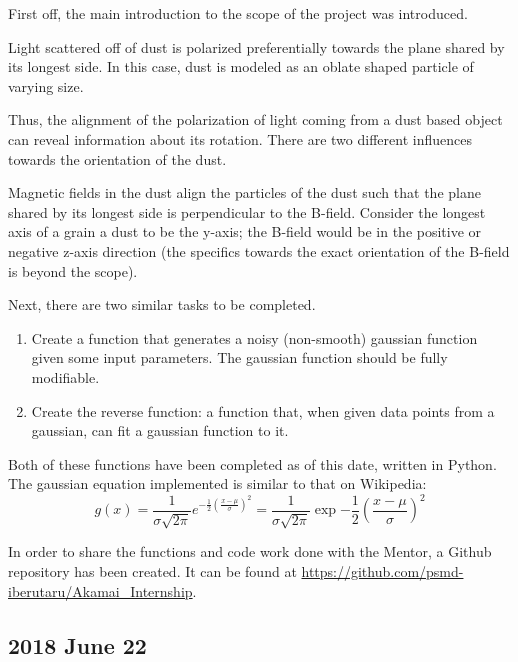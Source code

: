 \documentclass[twocolumn]{article}
\begin{document}
\begin{meetingnotes*}
	First off, the main introduction to the scope of the project was introduced.

	Light scattered off of dust is polarized preferentially towards the plane shared by its longest side. In this case, dust is modeled as an oblate shaped particle of varying size.

	Thus, the alignment of the polarization of light coming from a dust based object can reveal information about its rotation. There are two different influences towards the orientation of the dust. 

	Magnetic fields in the dust align the particles of the dust such that the plane shared by its longest side is perpendicular to the B-field. Consider the longest axis of a grain a dust to be the y-axis; the B-field would be in the positive or negative z-axis direction (the specifics towards the exact orientation of the B-field is beyond the scope).

	Next, there are two similar tasks to be completed.
	\begin{enumerate}
		\item Create a function that generates a noisy (non-smooth) gaussian function given some input parameters. The gaussian function should be fully modifiable. 
		\item Create the reverse function: a function that, when given data points from a gaussian, can fit a gaussian function to it.
	\end{enumerate}
\end{meetingnotes*}

Both of these functions have been completed as of this date, written in Python. The gaussian equation implemented is similar to that on Wikipedia:
\begin{equation}
	g(x) = \frac{1}{\sigma \sqrt{2 \pi}} e^{ -\frac{1}{2} \left(\frac{x-\mu}{\sigma}\right)^2 } = \frac{1}{\sigma \sqrt{2 \pi}} \exp{ -\frac{1}{2} \left(\frac{x-\mu}{\sigma}\right)^2 }
	\label{eq:gaussian_probability_distribution}
\end{equation}

In order to share the functions and code work done with the Mentor, a Github repository has been created. It can be found at \url{https://github.com/psmd-iberutaru/Akamai_Internship}.

\subsection{2018 June 22}
\end{document}
